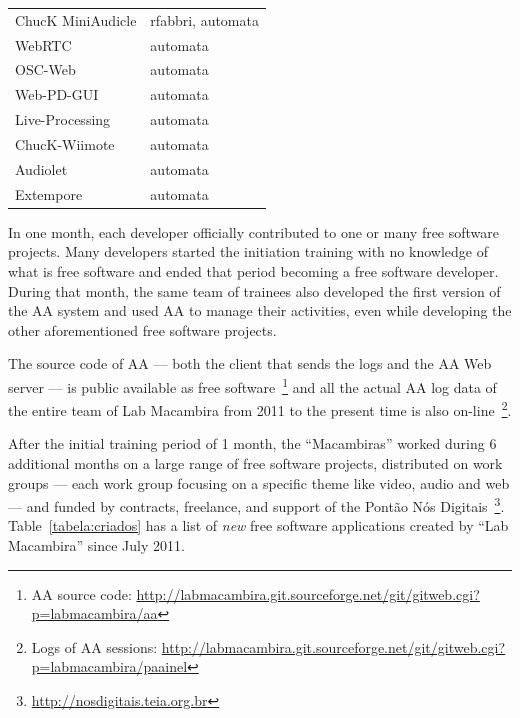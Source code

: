 \documentclass[letterpaper]{article}
\begin{document}
\begin{table}
\begin{tabular}{|l|l|}
        ChucK MiniAudicle     & rfabbri, automata                   \\
        WebRTC                & automata                            \\
        OSC-Web               & automata                            \\
        Web-PD-GUI            & automata                            \\
        Live-Processing       & automata                            \\
        ChucK-Wiimote         & automata                            \\
        Audiolet              & automata                            \\
        Extempore             & automata                            \\
        \hline
    \end{tabular}
    \label{tabela:contribuicoes}
\end{table}

In one month, each developer officially contributed to one or many free software
projects. Many developers started the initiation training with no knowledge of what
is free software and ended that period becoming a free software developer.
During that month, the same team of trainees also developed the first version of the AA
system and used AA to manage their activities, even while developing
the other aforementioned free software projects. 

The source code of AA --- both the client that sends the
logs and the AA Web server --- is public available as free software~\footnote{AA source
  code:
  \url{http://labmacambira.git.sourceforge.net/git/gitweb.cgi?p=labmacambira/aa}}
and all the actual AA log data of the entire team of Lab Macambira from 2011 to
the present time is also on-line~\footnote{Logs of AA sessions:
  \url{http://labmacambira.git.sourceforge.net/git/gitweb.cgi?p=labmacambira/paainel}}.

After the initial training period of 1 month, the ``Macambiras''
worked during 6 additional months on a large range of free software projects, distributed on work
groups --- each work group focusing on a specific theme like video,
audio and web --- and funded by contracts, freelance, and support of the
Pont\~{a}o N\'{o}s Digitais~\footnote{\url{http://nosdigitais.teia.org.br}}. 
Table~\ref{tabela:criados} has a list of \emph{new} free software applications created by
``Lab Macambira'' since July 2011.
\end{document}
